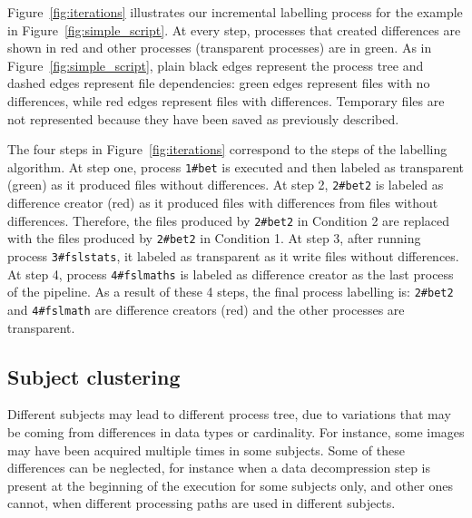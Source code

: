 \documentclass[a4paper,num-refs]{oup-contemporary}
\begin{document}
Figure~\ref{fig:iterations} illustrates our incremental labelling 
process for the example in Figure~\ref{fig:simple_script}. At every 
step, processes that created differences are shown in red and other processes 
(transparent processes) are in green. As in 
Figure~\ref{fig:simple_script}, plain black edges represent the process 
tree and dashed edges represent file dependencies: green edges 
represent files with no differences, while red edges represent files with 
differences. Temporary files are not represented because they have been 
saved as previously described.

The four steps in Figure~\ref{fig:iterations} correspond to the 
steps of the labelling algorithm. 
At step one, process \texttt{1\#bet} is executed and then labeled 
as transparent (green) as it produced files without differences.
At step 2, \texttt{2\#bet2} 
is labeled as difference creator (red) as it produced files with differences 
from files without differences. Therefore, the files produced by \texttt{2\#bet2} in  
Condition 2 are replaced with the files produced by \texttt{2\#bet2} in 
Condition 1.
At step 3, after running process \texttt{3\#fslstats}, it labeled as 
transparent as it write files without differences.
At step 4, process \texttt{4\#fslmaths} is labeled as difference creator 
as the last process of the pipeline.
As a result of these 4 steps, the final process labelling is: 
\texttt{2\#bet2} and \texttt{4\#fslmath} are difference creators (red) 
and the other processes are transparent.


\subsection{Subject clustering}

Different subjects may lead to different process tree, due to
variations that may be coming from differences in data types or
cardinality. For instance, some images may have been acquired multiple
times in some subjects. Some of these differences can be neglected, for
instance when a data decompression step is present at the beginning of the
execution for some subjects only, and other ones cannot, when different
processing paths are used in different subjects.
\end{document}
